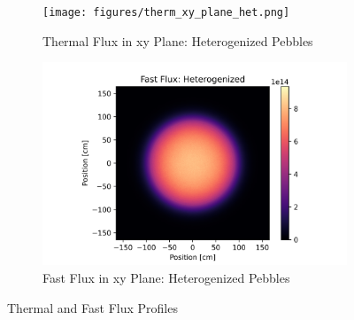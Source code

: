 \begin{figure}[h!]
\centering

\begin{subfigure}{0.45\textwidth}
  \texttt{[image: figures/therm\_xy\_plane\_het.png]}
  \caption{Thermal Flux in xy Plane: Heterogenized Pebbles}
  \label{fig:het-plane-therm}
\end{subfigure}%
%
\begin{subfigure}{0.45\textwidth}
  \includegraphics[width=0.95\linewidth]{figures/fast_xy_plane_het.png}
  \caption{Fast Flux in xy Plane: Heterogenized Pebbles}
  \label{fig:het-plane-fast}
\end{subfigure}

%
\caption{Thermal and Fast Flux Profiles}
\label{fig:het-det-plane}
\end{figure}